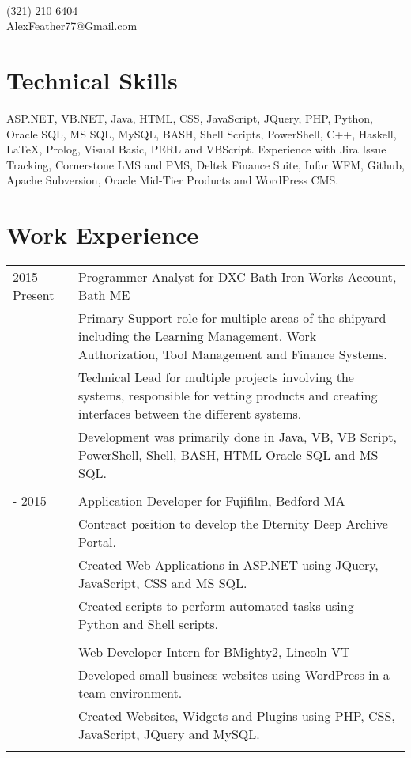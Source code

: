 \documentclass[12pt]{article}
\begin{document}
\pagestyle{empty}
\selectfont

{\\
\vspace{0.1cm}(321) 210 6404\\\vspace{0.1cm}AlexFeather77@Gmail.com\\}
\vspace{0.4cm}

\section*{\selectfont Technical Skills}
ASP.NET, VB.NET, Java, HTML, CSS, JavaScript, JQuery, PHP, Python, Oracle SQL, MS SQL, MySQL, BASH, Shell Scripts, PowerShell, C++, Haskell, \LaTeX, Prolog, Visual Basic, PERL and VBScript. Experience with Jira Issue Tracking, Cornerstone LMS and PMS, Deltek Finance Suite, Infor WFM, Github, Apache Subversion, Oracle Mid-Tier Products and WordPress CMS.

\section*{\selectfont Work Experience}
\begin{tabular}{p{2.7cm}|p{15.0cm}}
	2015 - Present & Programmer Analyst for DXC Bath Iron Works Account, Bath ME\\&\small{Primary Support role for multiple areas of the shipyard including the Learning Management, Work Authorization, Tool Management and Finance Systems.}\\&\small{Technical Lead for multiple projects involving the systems, responsible for vetting products and creating interfaces between the different systems.}\\&\small{Development was primarily done in Java, VB, VB Script, PowerShell, Shell, BASH, HTML Oracle SQL and MS SQL.}
	\\\multicolumn{2}{c}{} \\
	\centering 2014 - 2015 & Application Developer for Fujifilm, Bedford MA\\&\small{Contract position to develop the Dternity Deep Archive Portal.}\\&\small{Created Web Applications in ASP.NET using JQuery, JavaScript, CSS and MS SQL.}\\&\small{Created scripts to perform automated tasks using Python and Shell scripts.}
	\\\multicolumn{2}{c}{} \\
	\centering 2013 & Web Developer Intern for BMighty2, Lincoln VT\\&\small{Developed small business websites using WordPress in a team environment.}\\&\small{Created Websites, Widgets and Plugins using PHP, CSS, JavaScript, JQuery and MySQL.}\\\multicolumn{2}{c}{} \\
\end{tabular}
\end{document}
